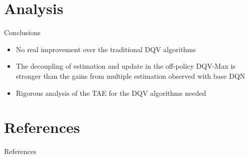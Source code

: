 \documentclass[presentation]{beamer}
\begin{document}
\section{Analysis}
\label{sec:orgba7a492}
\begin{frame}[label={sec:org4c114e6}]{Conclusions}
\begin{itemize}
\item No real improvement over the traditional DQV algorithms
\item The decoupling of estimation and update in the off-policy DQV-Max
is stronger than the gains from multiple estimation observed with
base DQN
\item Rigorous analysis of the TAE for the DQV algorithms needed
\end{itemize}
\end{frame}
\section{References}
\label{sec:org755a433}
\begin{frame}[allowframebreaks]{References}


\end{frame}
\end{document}
